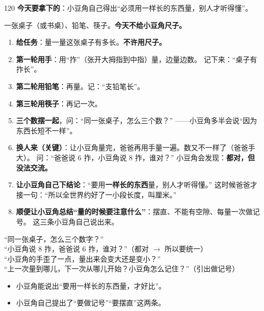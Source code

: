 \begin{lesson}{1}{20}
\textbf{今天要拿下的}：小豆角自己得出“必须用一样长的东西量，别人才听得懂”。

\begin{materials}
一张桌子（或书桌）、铅笔、筷子。\textbf{今天不给小豆角尺子。}
\end{materials}

\begin{enumerate}
  \item \textbf{给任务}：量一量这张桌子有多长。\textbf{不许用尺子。}
  \item \textbf{第一轮用手}：用“拃”（张开大拇指到中指）量，边量边数。
        记下来：“桌子有 \blank 拃长”。
  \item \textbf{第二轮用铅笔}：再量。记：“\blank 支铅笔长”。
  \item \textbf{第三轮用筷子}：再记一次。
  \item \textbf{三个数摆一起}，问：“同一张桌子，怎么三个数？”
        ——小豆角多半会说“因为东西长短不一样”。
  \item \textbf{换人来（关键）}：让小豆角量完，爸爸再用手量一遍。数又不一样了（爸爸手大）。
        问：“爸爸说 6 拃，小豆角说 8 拃，谁对？”
        小豆角会发现：\textbf{都对，但没法交流。}
  \item \textbf{让小豆角自己下结论}：“要用\textbf{一样长的东西}量，别人才听得懂。”
        这时候爸爸才接一句：“所以全世界约好了一小段长度，叫厘米。”
  \item \textbf{顺便让小豆角总结“量的时候要注意什么”}：摆直、不能有空隙、每量一次做记号。
        这三条小豆角自己说出来。
\end{enumerate}

\begin{saybox}
“同一张桌子，怎么三个数字？”\\
“小豆角说 8 拃，爸爸说 6 拃，谁对？”（都对 $\to$ 所以要统一）\\
“小豆角的手歪了一点，量出来会变大还是变小？”\\
“上一次量到哪儿，下一次从哪儿开始？小豆角怎么记住？”（引出做记号）
\end{saybox}

\begin{passbox}
\begin{itemize}
  \item 小豆角能说出“要用一样长的东西量，才好比”。
  \item 小豆角自己提出了“要做记号”“要摆直”这两条。
\end{itemize}
\end{passbox}
\end{lesson}

